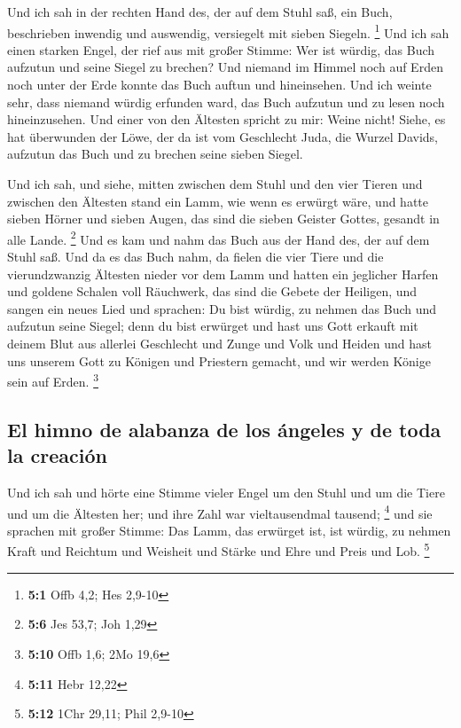  Und ich sah in der rechten Hand des, der auf dem Stuhl
saß, ein Buch, beschrieben inwendig und auswendig, versiegelt mit sieben
Siegeln. \footnote{\textbf{5:1} Offb 4,2; Hes 2,9-10}  Und
ich sah einen starken Engel, der rief aus mit großer Stimme: Wer ist
würdig, das Buch aufzutun und seine Siegel zu brechen? 
Und niemand im Himmel noch auf Erden noch unter der Erde konnte das Buch
auftun und hineinsehen.  Und ich weinte sehr, dass niemand
würdig erfunden ward, das Buch aufzutun und zu lesen noch hineinzusehen.
 Und einer von den Ältesten spricht zu mir: Weine nicht!
Siehe, es hat überwunden der Löwe, der da ist vom Geschlecht Juda, die
Wurzel Davids, aufzutun das Buch und zu brechen seine sieben Siegel.

 Und ich sah, und siehe, mitten zwischen dem Stuhl und den
vier Tieren und zwischen den Ältesten stand ein Lamm, wie wenn es
erwürgt wäre, und hatte sieben Hörner und sieben Augen, das sind die
sieben Geister Gottes, gesandt in alle Lande. \footnote{\textbf{5:6} Jes
  53,7; Joh 1,29}  Und es kam und nahm das Buch aus der
Hand des, der auf dem Stuhl saß.  Und da es das Buch nahm,
da fielen die vier Tiere und die vierundzwanzig Ältesten nieder vor dem
Lamm und hatten ein jeglicher Harfen und goldene Schalen voll Räuchwerk,
das sind die Gebete der Heiligen,  und sangen ein neues
Lied und sprachen: Du bist würdig, zu nehmen das Buch und aufzutun seine
Siegel; denn du bist erwürget und hast uns Gott erkauft mit deinem Blut
aus allerlei Geschlecht und Zunge und Volk und Heiden 
und hast uns unserem Gott zu Königen und Priestern gemacht, und wir
werden Könige sein auf Erden. \footnote{\textbf{5:10} Offb 1,6; 2Mo 19,6}

\hypertarget{el-himno-de-alabanza-de-los-uxe1ngeles-y-de-toda-la-creaciuxf3n}{%
\subsection{El himno de alabanza de los ángeles y de toda la
creación}\label{el-himno-de-alabanza-de-los-uxe1ngeles-y-de-toda-la-creaciuxf3n}}

 Und ich sah und hörte eine Stimme vieler Engel um den
Stuhl und um die Tiere und um die Ältesten her; und ihre Zahl war
vieltausendmal tausend; \footnote{\textbf{5:11} Hebr 12,22}
 und sie sprachen mit großer Stimme: Das Lamm, das
erwürget ist, ist würdig, zu nehmen Kraft und Reichtum und Weisheit und
Stärke und Ehre und Preis und Lob. \footnote{\textbf{5:12} 1Chr 29,11;
  Phil 2,9-10}

